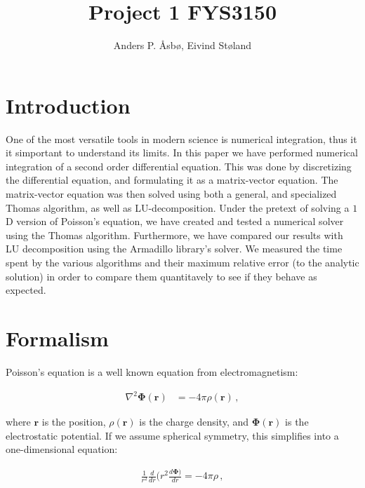 \documentclass[english,notitlepage,reprint]{revtex4-1}  %
\begin{document}
\title{Project 1 FYS3150}   %
\author{Anders P. Åsbø, Eivind Støland}               %

\noaffiliation                            %

\maketitle
\tableofcontents

\section{Introduction} \label{sec:I}

One of the most versatile tools in modern science is numerical integration, thus it it simportant to understand its limits. In this paper we have performed numerical integration of a second order differential equation. This was done by discretizing the differential equation, and formulating it as a matrix-vector equation. The matrix-vector equation was then solved using both a general, and specialized Thomas algorithm, as well as LU-decomposition. Under the pretext of solving a \(1\)D version of Poisson's equation, we have created and tested a numerical solver using the Thomas algorithm. Furthermore, we have compared our results with LU decomposition using the Armadillo library's solver. We measured the time spent by the various algorithms and their maximum relative error (to the analytic solution) in order to compare them quantitavely to see if they behave as expected. 





\section{Formalism} \label{sec:II}

Poisson's equation is a well known equation from electromagnetism:

\begin{align*}
\nabla^2 \boldsymbol\Phi (\boldsymbol r) &= -4\pi \rho (\boldsymbol r) \, ,
\end{align*}

where $\boldsymbol r$ is the position, $\rho(\boldsymbol r)$ is the charge density, and $\boldsymbol \Phi (\boldsymbol r)$ is the electrostatic potential. If we assume spherical symmetry, this simplifies into a one-dimensional equation:

\begin{align*}
\frac{1}{r^2} \frac{d}{dr} (r^2 \frac{d\boldsymbol \Phi)}{dr} = - 4\pi \rho \, ,
\end{align*}
\end{document}
